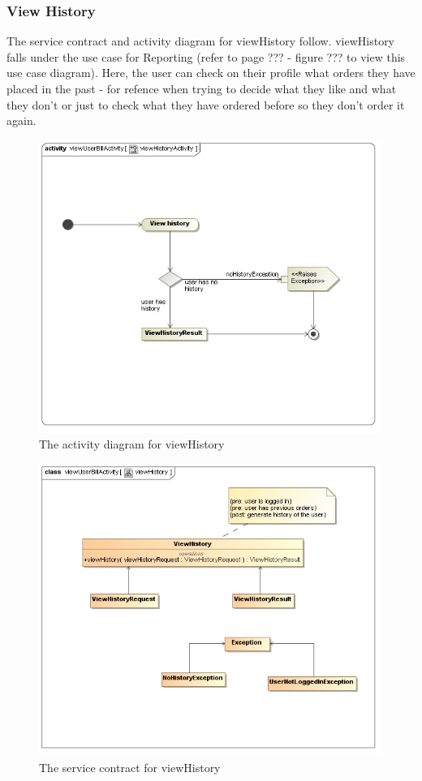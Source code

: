 \documentclass[a4paper,12pt]{report}
\begin{document}
\subsubsection{View History }
The service contract and activity diagram for viewHistory follow. viewHistory falls under the use case for Reporting (refer to page ??? - figure ??? to view this use case diagram). Here, the user can check on their profile what orders they have placed in the past - for refence when trying to decide what they like and what they don't or just to check what they have ordered before so they don't order it again.

\begin{figure}[H]
  \centering
    \includegraphics[width=1.0\textwidth]{../images/viewHistoryActivity.jpg}
    \caption{The activity diagram for viewHistory}
\end{figure}
\begin{figure}[H]
  \centering
    \includegraphics[width=1.0\textwidth]{../images/viewHistory.jpg}
    \caption{The service contract for viewHistory}
\end{figure}
\end{document}
